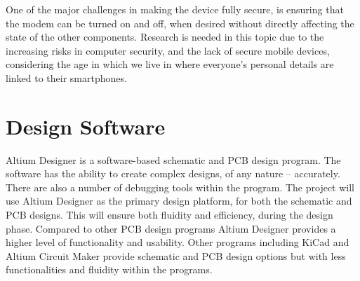 One of the major challenges in making the device fully secure, is ensuring that the modem can be turned on and off, when desired without directly affecting the state of the other components. 
	Research is needed in this topic due to the increasing risks in computer security, and the lack of secure mobile devices, considering the age in which we live in where everyone’s personal details are linked to their smartphones.


\section{Design Software}

Altium Designer is a software-based schematic and PCB design program.
The software has the ability to create complex designs, of any nature – accurately.
There are also a number of debugging tools within the program. 
The project will use Altium Designer as the primary design platform, for both the schematic and PCB designs.
This will ensure both fluidity and efficiency, during the design phase. 
Compared to other PCB design programs Altium Designer provides a higher level of functionality and usability.
Other programs including KiCad and Altium Circuit Maker provide schematic and PCB design options but with less functionalities and fluidity within the programs. 

